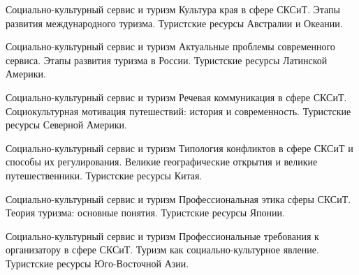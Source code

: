 \documentclass[
	11pt,
	a4paper,
	]
	{article}
\begin{document}
	

\begin{minipage}[t][\miniH]{\miniL}\centering
	 {Социально-культурный сервис и туризм}
		{
			Культура края в сфере СКСиТ.
		}{
			Этапы развития международного туризма.
		}{
			Туристские ресурсы Австралии и Океании.
		}
	\lowGE
\end{minipage}

\vfill



\begin{minipage}[t][\miniH]{\miniL}\centering
	 {Социально-культурный сервис и туризм}
		{
			Актуальные проблемы современного сервиса.
		}{
			Этапы развития туризма в России.
		}{
			Туристские ресурсы Латинской Америки.
		}
	\lowGE
\end{minipage}

\vfill



\begin{minipage}[t][\miniH]{\miniL}\centering
	 {Социально-культурный сервис и туризм}
		{
			Речевая коммуникация в сфере СКСиТ.
		}{
			Социокультурная мотивация путешествий: история и современность.
		}{
			Туристские ресурсы Северной Америки.
		}
	\lowGE
\end{minipage}





\begin{minipage}[t][\miniH]{\miniL}\centering
	 {Социально-культурный сервис и туризм}
		{
			Типология конфликтов в сфере СКСиТ и способы их регулирования.
		}{
			Великие географические открытия и великие путешественники.
		}{
			Туристские ресурсы Китая.
		}
	\lowGE
\end{minipage}

\vfill



\begin{minipage}[t][\miniH]{\miniL}\centering
	 {Социально-культурный сервис и туризм}
		{
			Профессиональная этика сферы СКСиТ.
		}{
			Теория туризма: основные понятия.
		}{
			Туристские ресурсы Японии.
		}
	\lowGE
\end{minipage}

\vfill



\begin{minipage}[t][\miniH]{\miniL}\centering
	 {Социально-культурный сервис и туризм}
		{
			Профессиональные требования к организатору в сфере СКСиТ.
		}{
			Туризм как социально-культурное явление.
		}{
			Туристские ресурсы Юго-Восточной Азии.
		}
	\lowGE
\end{minipage}
\end{document}

